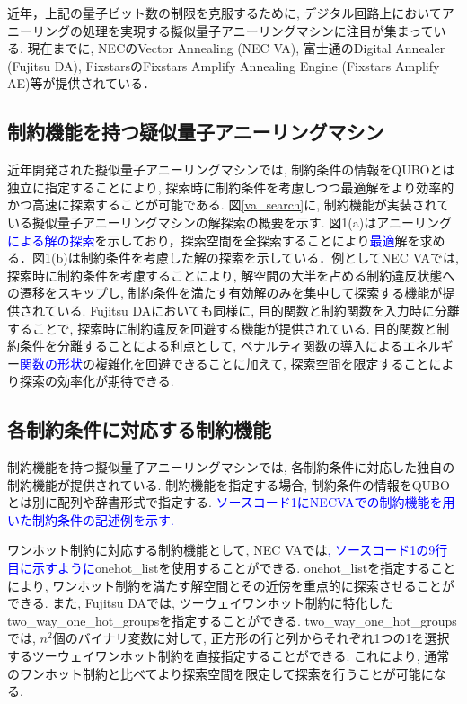 \documentclass[submit,techrep,noauthor]{ipsj}
\begin{document}
近年，上記の量子ビット数の制限を克服するために, デジタル回路上においてアニーリングの処理を実現する擬似量子アニーリングマシンに注目が集まっている. 現在までに, NECのVector Annealing (NEC VA)\cite{va}, 富士通のDigital Annealer (Fujitsu DA)\cite{da}, FixstarsのFixstars Amplify Annealing Engine (Fixstars Amplify AE)\cite{amplify}等が提供されている．

\subsection{制約機能を持つ疑似量子アニーリングマシン}
近年開発された擬似量子アニーリングマシンでは, 制約条件の情報をQUBOとは独立に指定することにより, 探索時に制約条件を考慮しつつ最適解をより効率的かつ高速に探索することが可能である. 図\ref{va_search}に, 制約機能が実装されている擬似量子アニーリングマシンの解探索の概要を示す. 図1(a)はアニーリング\textcolor{blue}{による解の探索}を示しており，探索空間を全探索することにより\textcolor{blue}{最適}解を求める．図1(b)は制約条件を考慮した解の探索を示している．例としてNEC VAでは, 探索時に制約条件を考慮することにより, 解空間の大半を占める制約違反状態への遷移をスキップし, 制約条件を満たす有効解のみを集中して探索する機能が提供されている. Fujitsu DAにおいても同様に, 目的関数と制約関数を入力時に分離することで, 探索時に制約違反を回避する機能が提供されている. 目的関数と制約条件を分離することによる利点として, ペナルティ関数の導入によるエネルギー\textcolor{blue}{関数の形状}の複雑化を回避できることに加えて, 探索空間を限定することにより探索の効率化が期待できる.

\subsection{各制約条件に対応する制約機能}
制約機能を持つ擬似量子アニーリングマシンでは, 各制約条件に対応した独自の制約機能が提供されている. 制約機能を指定する場合, 制約条件の情報をQUBOとは別に配列や辞書形式で指定する. \textcolor{blue}{ソースコード1にNECVAでの制約機能を用いた制約条件の記述例を示す.} 

ワンホット制約に対応する制約機能として, NEC VAでは\textcolor{blue}{, ソースコード1の9行目に示すように}onehot\_listを使用することができる. onehot\_listを指定することにより, ワンホット制約を満たす解空間とその近傍を重点的に探索させることができる. また, Fujitsu DAでは, ツーウェイワンホット制約に特化したtwo\_way\_one\_hot\_groupsを指定することができる. two\_way\_one\_hot\_groupsでは, $n^{2}$個のバイナリ変数に対して, 正方形の行と列からそれぞれ1つの1を選択するツーウェイワンホット制約を直接指定することができる. これにより, 通常のワンホット制約と比べてより探索空間を限定して探索を行うことが可能になる\cite{komatsu2}.
\end{document}
